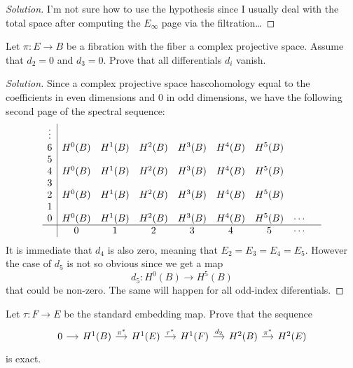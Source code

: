 \begin{proof}[Solution]\leavevmode
	I'm not sure how to use the hypothesis since I usually deal with the total space after computing the $E_\infty$ page via the filtration…
\end{proof}

\begin{manualexercise}{2.6}
	Let $\pi:E\to B$ be a fibration with the fiber a complex projective space. Assume that $d_2=0$ and $d_3=0$. Prove that all differentials $d_i$ vanish.
\end{manualexercise}

\begin{proof}[Solution]\leavevmode
	Since a complex projective space hascohomology equal to the coefficients in even dimensions and 0 in odd dimensions, we have the following second page of the spectral sequence:
	\begin{align*}
\begin{array}{c|cccccccc}
	\vdots &&&&&&&&\\
	6&H^0(B)&H^1(B)&H^{2}(B)&H^{3}(B)&H^{4}(B)&H^{5}(B)&&\\
	5&&&&&&&&\\
	4&H^0(B)&H^1(B)&H^{2}(B)&H^{3}(B)&H^{4}(B)&H^{5}(B)&&\\
	3&&&&&&&&\\
	2&H^0(B)&H^1(B)&H^2(B)&H^{3}(B)&H^{4}(B)&H^{5}(B)&&\\
	1&&&&&&&&\\
	0&H^0(B)&H^1(B)&H^2(B)&H^3(B)&H^4(B)&H^{5}(B)&\cdots &\\
	\hline
	 &0&1&2&3&4&5&\cdots&
\end{array}
\end{align*}
It is immediate that $d_4$ is also zero, meaning that $E_2=E_3=E_4=E_5$. However the case of $d_5$ is not so obvious since we get a map
\[d_5:H^{0}(B)\to H^{5}(B)\]
that could be non-zero. The same will happen for all odd-index diferentials.
\end{proof}

\begin{manualexercise}{2.7}
	Let $\tau:F\to E$ be the standard embedding map. Prove that the sequence
	\[\begin{tikzcd}[column sep=small]
		0\arrow[r]&H^{1}(B)\arrow[r,"\pi^*"]&H^{1}(E)\arrow[r,"\tau^*"]&H^{1}(F)\arrow[r,"d_2"]&H^{2}(B)\arrow[r,"\pi^*"]&H^{2}(E)
	\end{tikzcd}\]
	is exact.
\end{manualexercise}

